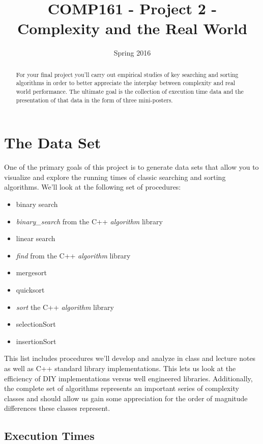 \documentclass[]{tufte-handout}
\title{COMP161 - Project 2 - Complexity and the Real World}
\author{}
\date{Spring 2016}
\begin{document}
\maketitle

\begin{abstract}
For your final project you'll carry out empirical studies of key searching and sorting algorithms in order to better appreciate the interplay between complexity and real world performance. The ultimate goal is the collection of execution time data and the presentation of that data in the form of three mini-posters. 
\end{abstract}

\section{The Data Set}

One of the primary goals of this project is to generate data sets that allow you to visualize and explore the running times of classic searching and sorting algorithms. We'll look at the following set of procedures: 
\begin{itemize}
\item binary search 
\item  \textit{binary\_search} from the C++ \textit{algorithm} library 
\item linear search 
\item  \textit{find} from the C++ \textit{algorithm} library
\item mergesort 
\item quicksort 
\item \textit{sort} the C++ \textit{algorithm} library 
\item selectionSort 
\item insertionSort 
\end{itemize}
This list includes procedures we'll develop and analyze in class and lecture notes as well as C++ standard library implementations. This lets us look at the efficiency of DIY implementations versus well engineered libraries. Additionally, the complete set of algorithms represents an important series of complexity classes and should allow us gain some appreciation for the order of magnitude differences these classes represent. 

\subsection{Execution Times}
\end{document}
